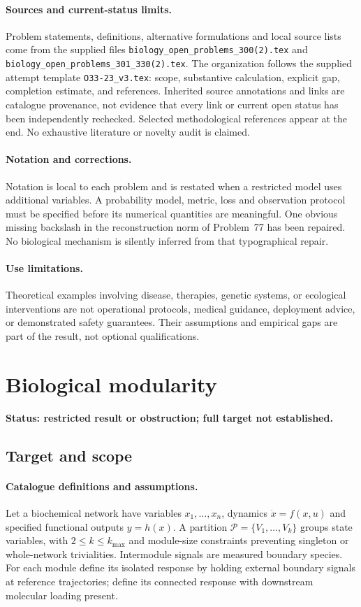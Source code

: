 \documentclass[11pt]{article}
\begin{document}
\paragraph{Sources and current-status limits.}
Problem statements, definitions, alternative formulations and local source lists
come from the supplied files
\texttt{biology\_open\_problems\_300(2).tex} and
\texttt{biology\_open\_problems\_301\_330(2).tex}.
The organization follows the supplied attempt template
\texttt{O33-23\_v3.tex}: scope, substantive calculation, explicit gap,
completion estimate, and references. Inherited source annotations and links are
catalogue provenance, not evidence that every link or current open status has
been independently rechecked. Selected methodological references appear at the
end. No exhaustive literature or novelty audit is claimed.

\paragraph{Notation and corrections.}
Notation is local to each problem and is restated when a restricted model uses
additional variables. A probability model, metric, loss and observation protocol
must be specified before its numerical quantities are meaningful. One obvious
missing backslash in the reconstruction norm of Problem~77 has been repaired.
No biological mechanism is silently inferred from that typographical repair.

\paragraph{Use limitations.}
Theoretical examples involving disease, therapies, genetic systems, or ecological
interventions are not operational protocols, medical guidance, deployment advice,
or demonstrated safety guarantees. Their assumptions and empirical gaps are part
of the result, not optional qualifications.


\section*{Biological modularity}
\label{prob:053}
\noindent\textbf{Status: restricted result or obstruction; full target not established.}
\subsection{Target and scope}
\paragraph{Catalogue definitions and assumptions.}
Let a biochemical network have variables $x_1,\ldots,x_n$, dynamics $\dot x=f(x,u)$ and specified functional outputs $y=h(x)$. A partition $\mathcal P=\{V_1,\ldots,V_k\}$ groups state variables, with $2\le k\le k_{\max}$ and module-size constraints preventing singleton or whole-network trivialities. Intermodule signals are measured boundary species. For each module define its isolated response by holding external boundary signals at reference trajectories; define its connected response with downstream molecular loading present.
\end{document}
